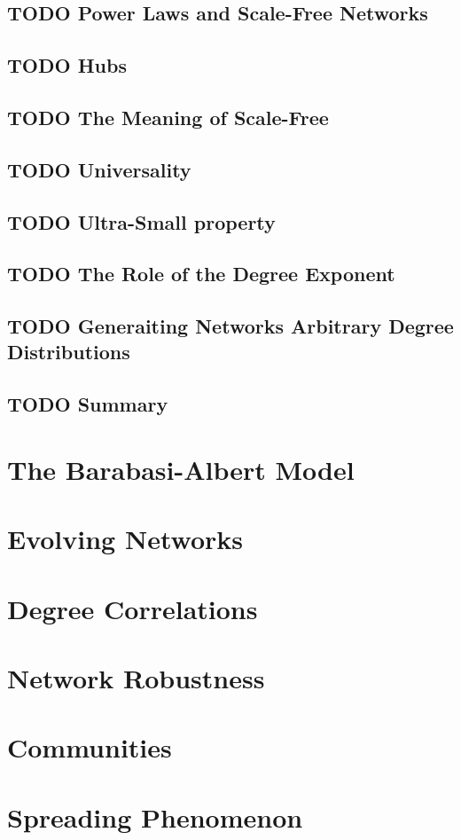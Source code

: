 \documentclass[11pt]{article}
\begin{document}
\subsection{{\bfseries\sffamily TODO} Power Laws and Scale-Free Networks}
\label{sec:orgc13b35c}
\subsection{{\bfseries\sffamily TODO} Hubs}
\label{sec:org00cdc63}
\subsection{{\bfseries\sffamily TODO} The Meaning of Scale-Free}
\label{sec:org447f485}
\subsection{{\bfseries\sffamily TODO} Universality}
\label{sec:org34134ff}
\subsection{{\bfseries\sffamily TODO} Ultra-Small property}
\label{sec:org229c33f}
\subsection{{\bfseries\sffamily TODO} The Role of the Degree Exponent}
\label{sec:orgad3c54c}
\subsection{{\bfseries\sffamily TODO} Generaiting Networks Arbitrary Degree Distributions}
\label{sec:orgf0e60a5}
\subsection{{\bfseries\sffamily TODO} Summary}
\label{sec:org55cb883}

\section{The Barabasi-Albert Model}
\label{sec:orgfee533a}
\section{Evolving Networks}
\label{sec:org248b6f8}
\section{Degree Correlations}
\label{sec:orgcda813b}
\section{Network Robustness}
\label{sec:orgab6ae6f}
\section{Communities}
\label{sec:org443a70c}
\section{Spreading Phenomenon}
\label{sec:org26a0b8d}
\end{document}
